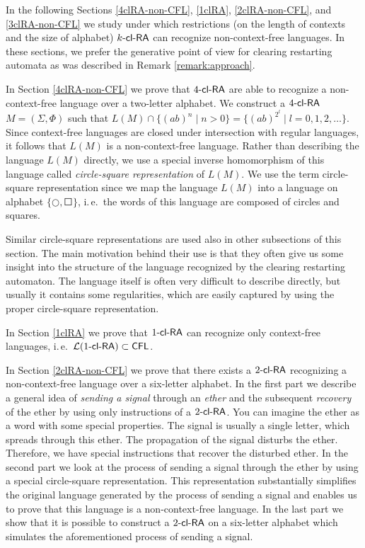 In the following Sections \ref{4clRA-non-CFL}, \ref{1clRA}, \ref{2clRA-non-CFL}, and \ref{3clRA-non-CFL} we study under which restrictions (on the length of contexts and the size of alphabet) $\kclRA[k]$ can recognize non-context-free languages. In these sections, we prefer the generative point of view for clearing restarting automata as was described in Remark \ref{remark:approach}.

In Section \ref{4clRA-non-CFL} we prove that $\kclRA[4]$ are able to recognize a non-context-free language over a two-letter alphabet. We construct a $\kclRA[4]$ $M = (\Sigma, \Phi)$ such that $L(M) \cap \{(ab)^n \mid n > 0\} = \{(ab)^{2^l} \mid l = 0, 1, 2, \ldots\}$. Since context-free languages are closed under intersection with regular languages, it follows that $L(M)$ is a non-context-free language. Rather than describing the language $L(M)$ directly, we use a special inverse homomorphism of this language called \emph{circle-square representation} of $L(M)$. We use the term circle-square representation since we map the language $L(M)$ into a language on alphabet $\{ \Circle, \Square \}$, i.\,e.\ the words of this language are composed of circles and squares.

Similar circle-square representations are used also in other subsections of this section. The main motivation behind their use is that they often give us some insight into the structure of the language recognized by the clearing restarting automaton. The language itself is often very difficult to describe directly, but usually it contains some regularities, which are easily captured by using the proper circle-square representation.

In Section \ref{1clRA} we prove that $\kclRA[1]$ can recognize only context-free languages, i.\,e.\ $\calL{\kclRA[1]} \subset \CFL$.

In Section \ref{2clRA-non-CFL} we prove that there exists a $\kclRA[2]$ recognizing a non-context-free language over a six-letter alphabet. In the first part we describe a general idea of \emph{sending a signal} through an \emph{ether} and the subsequent \emph{recovery} of the ether by using only instructions of a $\kclRA[2]$. You can imagine the ether as a word with some special properties. The signal is usually a single letter, which spreads through this ether. The propagation of the signal disturbs the ether. Therefore, we have special instructions that recover the disturbed ether. In the second part we look at the process of sending a signal through the ether by using a special circle-square representation. This representation substantially simplifies the original language generated by the process of sending a signal and enables us to prove that this language is a non-context-free language. In the last part we show that it is possible to construct a $\kclRA[2]$ on a six-letter alphabet which simulates the aforementioned process of sending a signal.

